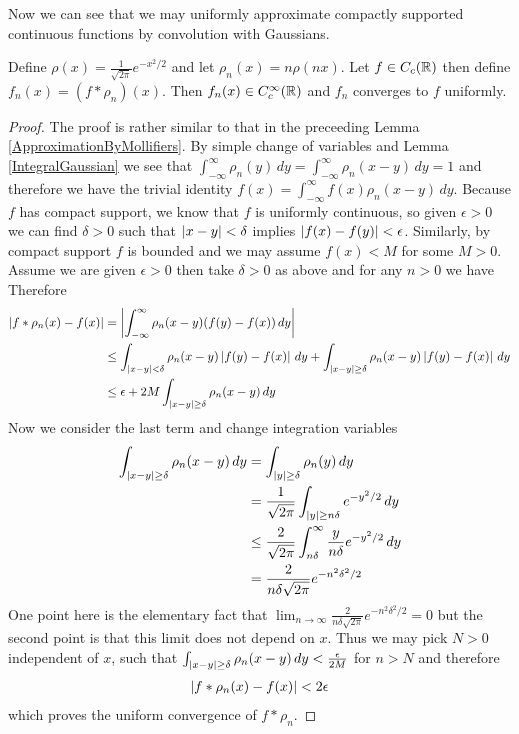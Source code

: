 Now we can see that we may uniformly approximate compactly supported continuous
functions by convolution with Gaussians.
\begin{lem}\label{UniformApproximationByGaussians}Define $\rho(x) =
  \frac{1}{\sqrt{2 \pi} }e^{-x^2/2}$ and let $\rho_n(x) = n\rho(nx)$.
Let $f \in C_c(\mathbb{R})$ then define $f_n(x) = (f *
  \rho_n)(x)$.  Then $f_n(x) \in C_c^\infty(\mathbb{R})$ and $f_n$
  converges to $f$ uniformly.
\end{lem}
\begin{proof}
The proof is rather similar to that in the preceeding Lemma
\ref{ApproximationByMollifiers}.  By simple change of variables and
Lemma \ref{IntegralGaussian} we see
that $\int_{-\infty}^{\infty} \rho_n(y) \, dy =
\int_{-\infty}^{\infty} \rho_n(x - y) \, dy = 1$ and therefore we
have the trivial identity $f(x) = \int_{-\infty}^{\infty} f(x)
\rho_n(x - y) \, dy$.  Because $f$ has compact support, we know that
$f$ is uniformly continuous, so given $\epsilon  > 0$ we can find
$\delta > 0$ such that $\left \vert x -y \right \vert < \delta$ implies $\left \vert f(x) -f(y) \right \vert
< \epsilon$.  Similarly, by compact support $f$ is bounded and we may
assume $f(x) < M$ for some $M > 0$.  Assume we are given
$\epsilon > 0$ then take $\delta>0$ as above and for any $n>0$ we have
Therefore
\begin{align*}
\left \vert f*\rho_n(x) - f(x) \right \vert &= \left \vert \int_{-\infty}^{\infty} \rho_n(x-y)
  (f(y) - f(x)) \, dy \right \vert \\
&\leq \int_{\left \vert x-y \right \vert < \delta} \rho_n(x-y)
  \left \vert   f(y) - f(x)  \right \vert \, dy + \int_{\left \vert x-y \right \vert \geq \delta} \rho_n(x-y)
  \left \vert  f(y) - f(x)  \right \vert \, dy \\
&\leq \epsilon + 2M \int_{\left \vert x-y \right \vert \geq \delta} \rho_n(x-y) \, dy
\end{align*}
Now we consider the last term and change integration variables
\begin{align*}
\int_{\left \vert x-y \right \vert \geq \delta} \rho_n(x-y) \, dy &= \int_{\left \vert y \right \vert \geq
  \delta} \rho_n(y) \, dy \\
&= \frac{1}{\sqrt{2 \pi}} \int_{\left \vert y \right \vert \geq
  n\delta} e^{-y^2/2} \, dy \\
&\leq \frac{2}{\sqrt{2 \pi}} \int_{n\delta}^\infty \frac{y}{n\delta}
e^{-y^2/2} \, dy \\
&= \frac{2}{n \delta \sqrt{2 \pi}} e^{-n^2\delta^2/2}
\end{align*}
One point here is the elementary fact that $\lim_{n \to \infty} \frac{2}{n \delta
  \sqrt{2 \pi}} e^{-n^2\delta^2/2} = 0$ but the second point is that this limit does
not depend on $x$.   Thus we may pick $N > 0$ independent of $x$, such
that $\int_{\left \vert x-y \right \vert \geq \delta} \rho_n(x-y) \, dy  <
\frac{\epsilon}{2M}$ for $n > N$ and therefore
\begin{align*}
\left \vert f*\rho_n(x) - f(x) \right \vert < 2 \epsilon
\end{align*}
which proves the uniform convergence of $f*\rho_n$.
\end{proof}

